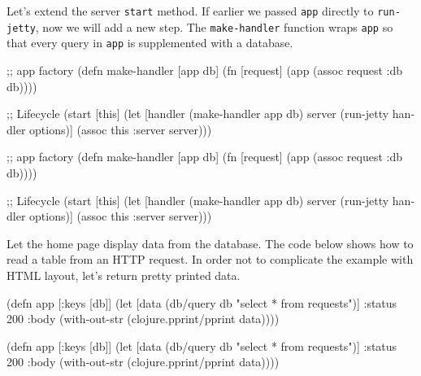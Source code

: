 Let's extend the server \verb|start| method. If earlier we passed \verb|app| directly to \verb|run-jetty|, now we will add a new step. The \texttt{make\--hand\-ler} function wraps \verb|app| so that every query in \verb|app| is supplemented with a database.

\ifnarrow

\begin{english}
  \begin{clojure}
;; app factory
(defn make-handler [app db]
  (fn [request]
    (app (assoc request :db db))))

;; Lifecycle
(start [this]
  (let [handler (make-handler app db)
        server (run-jetty handler
                 options)]
    (assoc this :server server)))
  \end{clojure}
\end{english}

\else

\begin{english}
  \begin{clojure}
;; app factory
(defn make-handler [app db]
  (fn [request]
    (app (assoc request :db db))))

;; Lifecycle
(start [this]
  (let [handler (make-handler app db)
        server (run-jetty handler options)]
    (assoc this :server server)))
  \end{clojure}
\end{english}

\fi

Let the home page display data from the database. The code below shows how to read a table from an HTTP request. In order not to complicate the example with HTML layout, let's return pretty printed data.

\ifnarrow

\begin{english}
  \begin{clojure}
(defn app [{:keys [db]}]
  (let [data (db/query db
               "select * from requests")]
    {:status 200
     :body (with-out-str
             (clojure.pprint/pprint
               data))}))
  \end{clojure}
\end{english}

\else

\begin{english}
  \begin{clojure}
(defn app [{:keys [db]}]
  (let [data (db/query db "select * from requests")]
    {:status 200
     :body (with-out-str
             (clojure.pprint/pprint data))}))
  \end{clojure}
\end{english}

